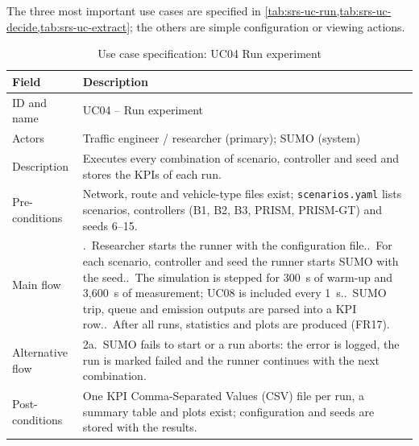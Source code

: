 The three most important use cases are specified in \cref{tab:srs-uc-run,tab:srs-uc-decide,tab:srs-uc-extract}; the others are simple configuration or viewing actions.

\begin{table}[htbp]
\centering
\caption{Use case specification: UC04 Run experiment}
\label{tab:srs-uc-run}
\small
\renewcommand{\arraystretch}{1.15}
\begin{tabularx}{\textwidth}{@{}>{\raggedright\arraybackslash}p{2.8cm}>{\raggedright\arraybackslash}X@{}}
\toprule
\textbf{Field} & \textbf{Description}\\
\midrule
ID and name & UC04 -- Run experiment\\
Actors & Traffic engineer / researcher (primary); SUMO (system)\\
Description & Executes every combination of scenario, controller and seed and stores the KPIs of each run.\\
Pre-conditions & Network, route and vehicle-type files exist; \texttt{scenarios.yaml} lists scenarios, controllers (B1, B2, B3, PRISM, PRISM-GT) and seeds 6--15.\\
Main flow & 1.~Researcher starts the runner with the configuration file.\newline
2.~For each scenario, controller and seed the runner starts SUMO with the seed.\newline
3.~The simulation is stepped for 300~s of warm-up and 3,600~s of measurement; UC08 is included every 1~s.\newline
4.~SUMO trip, queue and emission outputs are parsed into a KPI row.\newline
5.~After all runs, statistics and plots are produced (FR17).\\
Alternative flow & 2a.~SUMO fails to start or a run aborts: the error is logged, the run is marked failed and the runner continues with the next combination.\\
Post-conditions & One KPI Comma-Separated Values (CSV) file per run, a summary table and plots exist; configuration and seeds are stored with the results.\\
\bottomrule
\end{tabularx}
\end{table}

